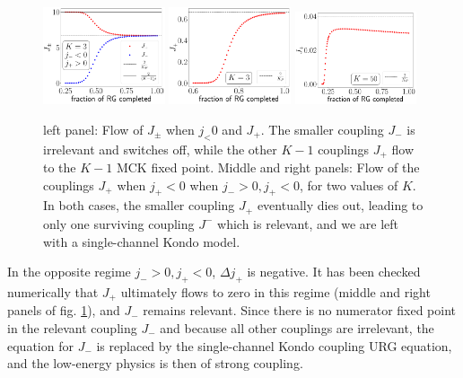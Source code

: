 \documentclass[reprint,prb,superscriptaddress]{revtex4-2}
\begin{document}
\begin{figure}[!htpb]
	\centering
	\includegraphics[width=0.32\textwidth]{../numerics/K to K-1.pdf}
	\includegraphics[width=0.32\textwidth]{../numerics/irr_Jp_K=3.pdf}
	\includegraphics[width=0.32\textwidth]{../numerics/irr_Jp_K=50.pdf}
	\caption{left panel: Flow of \(J_\pm\) when \(j_< 0\) and \(J_+\). The smaller coupling \(J_-\) is irrelevant and switches off, while the other \(K-1\) couplings \(J_+\) flow to the \(K-1\) MCK fixed point. Middle and right panels: Flow of the couplings \(J_+\) when \(j_+ < 0\) when \(j_- > 0, j_+ < 0\), for two values of \(K\). In both cases, the smaller coupling \(J_+\) eventually dies out, leading to only one surviving coupling \(J^-\) which is relevant, and we are left with a single-channel Kondo model.}
	\label{K_to_K-1}
\end{figure}

In the opposite regime \(j_- > 0, j_+ < 0\), \(\Delta j_+\) is negative. It has been checked numerically that \(J_+\) ultimately flows to zero in this regime (middle and right panels of fig. \ref{K_to_K-1}), and \(J_-\) remains relevant. Since there is no numerator fixed point in the relevant coupling \(J_-\) and because all other couplings are irrelevant, the equation for \(J_-\) is replaced by the single-channel Kondo coupling URG equation, and the low-energy physics is then of strong coupling.
\end{document}
